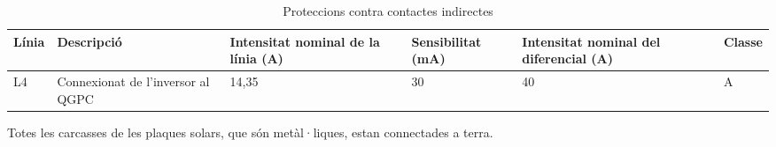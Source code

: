 \begin{table}[H]
\small
\begin{center}
 \begin{tabu} to \textwidth {|X[0.3, l]|X[1, l]|X[0.8, r]|X[0.7 , r]|X[0.7 , r]|X[0.4 , r]|}%
 \hline
 Línia & Descripció & Intensitat nominal de la línia (A) & Sensibilitat (mA) & Intensitat nominal del diferencial (A) & Classe\\ \hline \hline 

L4 & Connexionat de l'inversor al QGPC  & 14,35 & 30 & 40 & A \\ \hline

 \end{tabu}
 \caption{Proteccions contra contactes indirectes}
\end{center}
\end{table}

\noindent Totes les carcasses de les plaques solars, que són metàl·liques, estan connectades a terra.



\clearpage


%
